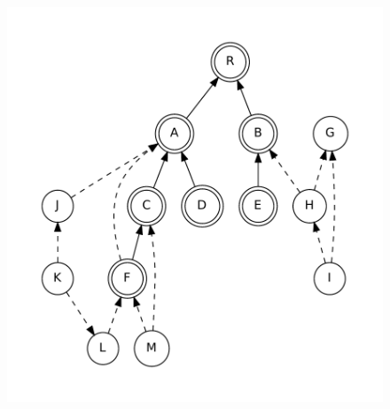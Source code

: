 \begin{figure}[t]
  \begin{minipage}[b]{.5\linewidth}
    \centering
    \includegraphics[scale=0.6]{figures/complementation/single-direct.pdf}
    \label{fig:stree1:simple}
  \end{minipage}
  \begin{minipage}[b]{.5\linewidth}
    \centering

\end{minipage}
\end{figure}
